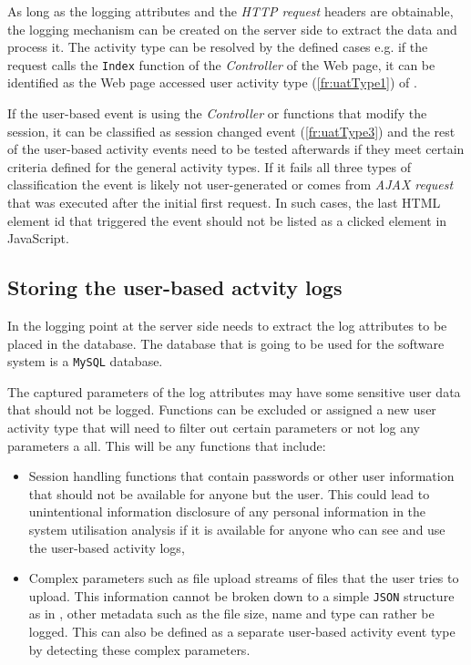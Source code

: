 As long as the logging attributes and the \textit{HTTP request} headers are obtainable, the logging mechanism can be created on the server side to extract the data and process it. The activity type can be resolved by the defined cases e.g. if the request calls the \texttt{Index} function of the \textit{Controller} of the Web page, it can be identified as the Web page accessed user activity type (\ref{fr:uatType1}) of .\par If the user-based event is using the \textit{Controller} or functions that modify the session, it can be classified as session changed event (\ref{fr:uatType3}) and the rest of the user-based activity events need to be tested afterwards if they meet certain criteria defined for the general activity types. If it fails all three types of classification the event is likely not user-generated or comes from \textit{AJAX request} that was executed after the initial first request. In such cases, the last HTML element id that triggered the event should not be listed as a clicked element in JavaScript.

\subsection{Storing the user-based actvity logs}\label{sec:ch2_databaseStorage}
In  the logging point at the server side needs to extract the log attributes to be placed in the database. The database that is going to be used for the software system is a \texttt{MySQL} database.\par The captured parameters of the log attributes may have some sensitive user data that should not be logged. Functions can be excluded or assigned a new user activity type that will need to filter out certain parameters or not log any parameters a all. This will be any functions that include:

\begin{itemize}
	\item Session handling functions that contain passwords or other user information that should not be available for anyone but the user. This could lead to unintentional information disclosure of any personal information in the system utilisation analysis if it is available for anyone who can see and use the user-based activity logs,
	\item Complex parameters such as file upload streams of files that the user tries to upload. This information cannot be broken down to a simple \texttt{JSON} structure as in , other metadata such as the file size, name and type can rather be logged. This can also be defined as a separate user-based activity event type by detecting these complex parameters.
\end{itemize}

